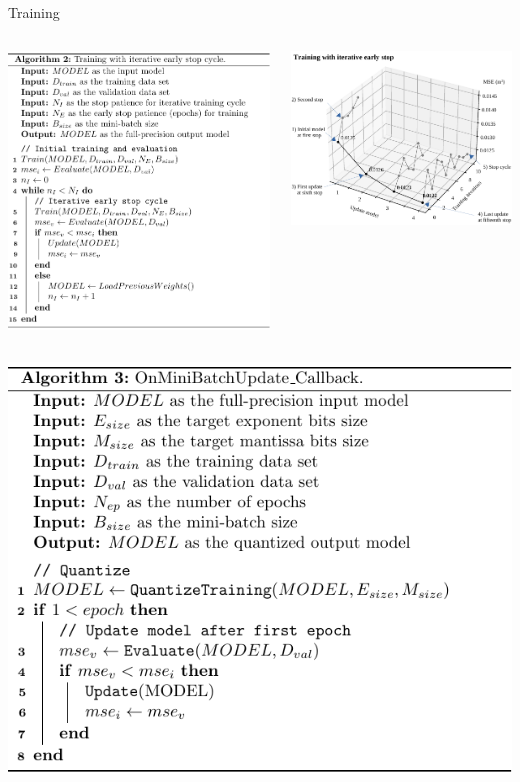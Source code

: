 \begin{frame}{Training}
	\begin{columns}
		\centering
		\includegraphics[width=0.65\linewidth]{slides/algorithm_early_stop_1.pdf} %
		\pause %
		
		\centering
		\includegraphics[width=0.65\linewidth]{slides/figures/training_iterative_early_stop.pdf} %
		\pause %
	\end{columns}
	
	\begin{columns}
		\column{0.5\textwidth}
		\centering
		\includegraphics[width=0.65\linewidth]{slides/OnMiniBatchUpdate_2.pdf} %
		\pause %
		

\end{columns}
\end{frame}
